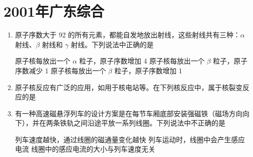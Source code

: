 \documentclass[\gkver]{gaokaozhenti}
\begin{document}
\chapter{2001年广东综合}

\begin{enumerate}
\item
原子序数大于 92 的所有元素，都能自发地放出射线，这些射线共有三种：$\alpha$ 射线、$\beta$ 射线和 $\gamma$ 射线。下列说法中正确的是

{原子核每放出一个 $\alpha$ 粒子，原子序数增加 4}
{原子核每放出一个 $\beta$ 粒子，原子序数减少 1}
{原子核每放出一个 $\beta$ 粒子，原子序数增加 1}


\item
原子核反应有广泛的应用，如用于核电站等。在下列核反应中，属于核裂变反应的是

{}
{}
{}


\item
有一种高速磁悬浮列车的设计方案是在每节车厢底部安装强磁铁（磁场方向向下），并在两条铁轨之间沿途平放一系列线圈。下列说法中不正确的是

{列车速度越快，通过线圈的磁通量变化越快}
{列车运动时，线圈中会产生感应电流}
{线圈中的感应电流的大小与列车速度无关}



\end{enumerate}
\end{document}
